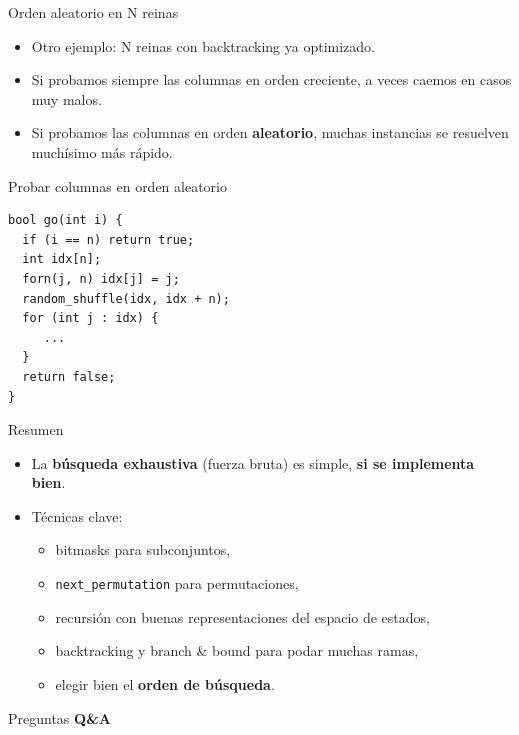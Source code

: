 \documentclass[aspectratio=169]{beamer}
\begin{document}
\begin{frame}[fragile]{Orden aleatorio en N reinas}
  \begin{itemize}
    \item Otro ejemplo: N reinas con backtracking ya optimizado.
    \item Si probamos siempre las columnas en orden creciente, a veces caemos en casos muy malos.
    \item Si probamos las columnas en orden \textbf{aleatorio}, muchas instancias se resuelven muchísimo más rápido.
  \end{itemize}
  \begin{block}{Probar columnas en orden aleatorio}
  \begin{lstlisting}[style=customc]
bool go(int i) {
  if (i == n) return true;
  int idx[n];
  forn(j, n) idx[j] = j;
  random_shuffle(idx, idx + n);
  for (int j : idx) {
     ...
  }
  return false;
}\end{lstlisting}
  \end{block}
\end{frame}

\begin{frame}{Resumen}
  \begin{itemize}
    \item La \textbf{búsqueda exhaustiva} (fuerza bruta) es simple, \textbf{si se implementa bien}.
    \item Técnicas clave:
      \begin{itemize}
        \item bitmasks para subconjuntos,
        \item \texttt{next\_permutation} para permutaciones,
        \item recursión con buenas representaciones del espacio de estados,
        \item backtracking y branch \& bound para podar muchas ramas,
        \item elegir bien el \textbf{orden de búsqueda}.
      \end{itemize}
  \end{itemize}
\end{frame}

\begin{frame}{Preguntas}
  \centering
  \Huge
  \textbf{Q\&A}
\end{frame}
\end{document}
